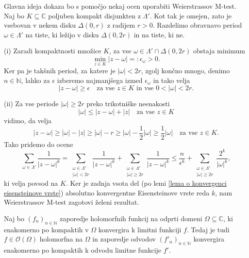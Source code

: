 \documentclass[mat1]{fmfdelo}
\numberwithin{equation}{section}
\newcommand{\N}{\mathbb N}
\newcommand{\C}{\mathbb C}
\newcommand{\om}{\omega}
\newcommand{\hol}[1]{\mathcal{O}(#1)}
\newcommand{\abs}[1]{\left\lvert #1 \right\rvert}
\theoremstyle{definition}
\begin{document}
\begin{dokaz}
    Glavna ideja dokaza bo s pomočjo nekaj ocen uporabiti Weierstrassov M-test. Naj bo $K \subseteq \C$ poljuben kompakt disjunkten z $\Lambda'$. Kot tak je omejen, zato je vsebovan v nekem disku $\Delta(0,r)$ z radijem $r > 0$. Razdelimo obravnavo period $\omega \in \Lambda'$ na tiste, ki ležijo v disku $\Delta(0,2r)$ in na tiste, ki ne.
    
    (i) Zaradi kompaktnosti množice $K$, za vse $\omega \in \Lambda' \cap \Delta(0,2r)$ obstaja minimum
    \[
        \min_{z \in K} \abs{z - \omega} =: \epsilon_\omega > 0.
    \]
    Ker pa je takšnih period, za katere je $\abs{\omega} < 2r$, zgolj končno mnogo, denimo $n \in \N$, lahko za $\epsilon$ izberemo najmanjšega izmed $\epsilon_\om$ in tako velja 
    \[
        \abs{z - \omega} \geq \epsilon \quad \text{za vse $z \in K$ in vse $0 < \abs{\omega} < 2r$.}  
    \]
    
    (ii) Za vse periode $\abs{\omega} \geq 2r$ preko trikotniške neenakosti
    \[
        \abs{\om} \leq \abs{z - \om} + \abs{z} \quad \text{za vse $z \in K$}
    \]
    vidimo, da velja 
    \[
        \abs{z - \om} \geq 
        \abs{\om} - \abs{z} \geq 
        \abs{\om} - r \geq 
        \abs{\om} - \frac{1}{2}\abs{\om} \geq
        \frac{1}{2}\abs{\om} \quad \text{za vse $z\in K$.}
    \]
    Tako pridemo do ocene
    \[
        \sum_{\om \in \Lambda'} \frac{1}{\abs{z - \om}^k} = 
        \sum_{\substack{\om \in \Lambda' \\ \abs{\om} < 2r}} \frac{1}{\abs{z - \om}^k} + \sum_{\substack{\om \in \Lambda' \\ \abs{\om} \geq 2r}} \frac{1}{\abs{z - \om}^k} \leq
        \frac{n}{\epsilon^k} + \sum_{\substack{\om \in \Lambda' \\ \abs{\om} \geq 2r}} \frac{2^k}{\abs{\om}^k},
    \]
    ki velja povsod na $K$. Ker je zadnja vsota del (po lemi \ref{lema o konvergenci eisensteinove vrste}) absolutno konvergentne Eisensteinove vrste reda $k$, nam Weierstrassov M-test zagotovi želeni rezultat.
\end{dokaz}

\begin{izrek}
    \label{izrek o konvergenci holomorfnih funkcij}
    Naj bo $(f_n)_{n \in \N}$ zaporedje holomorfnih funkcij na odprti domeni $\Omega \subseteq \C$, ki enakomerno po kompaktih v $\Omega$ konvergira k limitni funkciji $f$. Tedaj je tudi $f \in \hol{\Omega}$ holomorfna na $\Omega$ in zaporedje odvodov $(f'_n)_{n\in \N}$ konvergira enakomerno po kompaktih k odvodu limitne funkcije $f'$.
\end{izrek}
\end{document}

